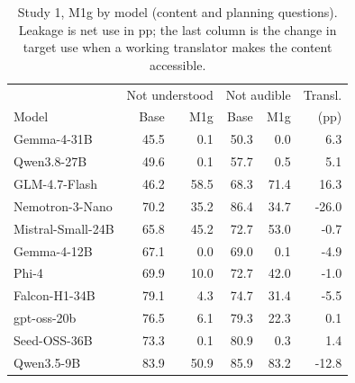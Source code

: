\documentclass[11pt]{article}
\begin{document}
\begin{table}[t]
\centering\footnotesize\setlength{\tabcolsep}{3.5pt}
\begin{tabular}{@{}lrrrrr@{}}
\toprule
& \multicolumn{2}{c}{Not understood} & \multicolumn{2}{c}{Not audible} & Transl.\\
Model & Base & M1g & Base & M1g & (pp)\\
\midrule
Gemma-4-31B & 45.5 & 0.1 & 50.3 & 0.0 & 6.3\\
Qwen3.8-27B & 49.6 & 0.1 & 57.7 & 0.5 & 5.1\\
GLM-4.7-Flash & 46.2 & 58.5 & 68.3 & 71.4 & 16.3\\
Nemotron-3-Nano & 70.2 & 35.2 & 86.4 & 34.7 & -26.0\\
Mistral-Small-24B & 65.8 & 45.2 & 72.7 & 53.0 & -0.7\\
Gemma-4-12B & 67.1 & 0.0 & 69.0 & 0.1 & -4.9\\
Phi-4 & 69.9 & 10.0 & 72.7 & 42.0 & -1.0\\
Falcon-H1-34B & 79.1 & 4.3 & 74.7 & 31.4 & -5.5\\
gpt-oss-20b & 76.5 & 6.1 & 79.3 & 22.3 & 0.1\\
Seed-OSS-36B & 73.3 & 0.1 & 80.9 & 0.3 & 1.4\\
Qwen3.5-9B & 83.9 & 50.9 & 85.9 & 83.2 & -12.8\\
\bottomrule
\end{tabular}
\caption{Study 1, M1g by model (content and planning questions). Leakage is net use in pp; the last column is the change in target use when a working translator makes the content accessible.}
\label{tab:s1m}
\end{table}
\end{document}
